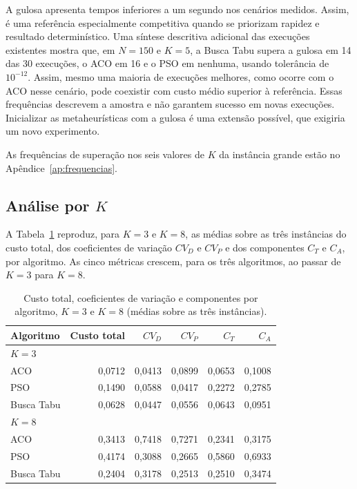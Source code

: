 \documentclass[12pt,a4paper]{article}
\begin{document}
A gulosa apresenta tempos inferiores a um segundo nos cenários medidos. Assim, é uma
referência especialmente competitiva quando se priorizam rapidez e resultado
determinístico. Uma síntese descritiva adicional das execuções existentes mostra que, em
$N=150$ e $K=5$, a Busca Tabu supera a gulosa em 14 das 30 execuções, o ACO em 16 e o
PSO em nenhuma, usando tolerância de $10^{-12}$. Assim, mesmo uma maioria de execuções
melhores, como ocorre com o ACO nesse cenário, pode coexistir com custo médio superior à
referência. Essas frequências descrevem a amostra e não garantem sucesso em novas
execuções. Inicializar as metaheurísticas com a gulosa é uma extensão possível, que
exigiria um novo experimento.

As frequências de superação nos seis valores de $K$ da instância grande estão no Apêndice~\ref{ap:frequencias}.

\subsection{Análise por \texorpdfstring{$K$}{K}}
\label{subsec:k}

A Tabela~\ref{tab:k3-k8} reproduz, para $K=3$ e $K=8$, as médias sobre as
três instâncias do custo total, dos coeficientes de variação $CV_D$ e $CV_P$
e dos componentes $C_T$ e $C_A$, por algoritmo. As cinco métricas crescem,
para os três algoritmos, ao passar de $K=3$ para $K=8$.

\begin{table}[htbp]
\centering
\caption{Custo total, coeficientes de variação e componentes por algoritmo, $K=3$ e $K=8$ (médias sobre as três instâncias).}
\label{tab:k3-k8}
\begin{tabular}{lrrrrr}
\toprule
Algoritmo & Custo total & $CV_D$ & $CV_P$ & $C_T$ & $C_A$ \\
\midrule
\multicolumn{6}{l}{\textit{$K=3$}} \\
ACO & 0,0712 & 0,0413 & 0,0899 & 0,0653 & 0,1008 \\
PSO & 0,1490 & 0,0588 & 0,0417 & 0,2272 & 0,2785 \\
Busca Tabu & 0,0628 & 0,0447 & 0,0556 & 0,0643 & 0,0951 \\
\midrule
\multicolumn{6}{l}{\textit{$K=8$}} \\
ACO & 0,3413 & 0,7418 & 0,7271 & 0,2341 & 0,3175 \\
PSO & 0,4174 & 0,3088 & 0,2665 & 0,5860 & 0,6933 \\
Busca Tabu & 0,2404 & 0,3178 & 0,2513 & 0,2510 & 0,3474 \\
\bottomrule
\end{tabular}
\end{table}
\end{document}

